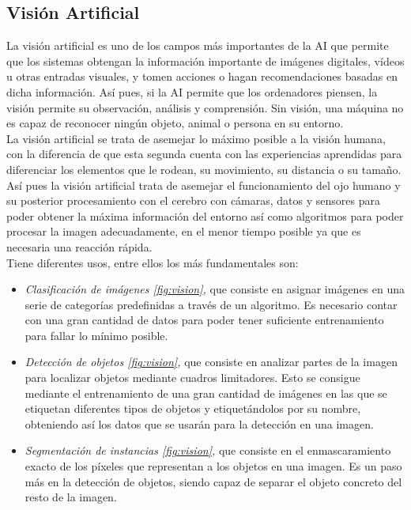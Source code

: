 \subsection{Visión Artificial}
\label{sec:subseccion}
La visión artificial es uno de los campos más importantes de la AI que permite que los sistemas obtengan la información importante de imágenes digitales, vídeos u otras entradas visuales, y tomen acciones o hagan recomendaciones basadas en dicha información. Así pues, si la AI permite que los ordenadores piensen, la visión permite su observación, análisis y comprensión. Sin visión, una máquina no es capaz de reconocer ningún objeto, animal o persona en su entorno. \\
La visión artificial se trata de asemejar lo máximo posible a la visión humana, con la diferencia de que esta segunda cuenta con las experiencias aprendidas para diferenciar los elementos que le rodean, su movimiento, su distancia o su tamaño. Así pues la visión artificial trata de asemejar el funcionamiento del ojo humano y su posterior procesamiento con el cerebro con cámaras, datos y sensores para poder obtener la máxima información del entorno así como algoritmos para poder procesar la imagen adecuadamente, en el menor tiempo posible ya que es necesaria una reacción rápida.\\
Tiene diferentes usos, entre ellos los más fundamentales son:
\begin{itemize}
 \item \textit{Clasificación de imágenes \ref{fig:vision},}  que consiste en asignar imágenes en una serie de categorías predefinidas a través de un algoritmo. Es necesario contar con una gran cantidad de datos para poder tener suficiente entrenamiento para fallar lo mínimo posible.
 \item \textit{Detección de objetos \ref{fig:vision},} que consiste en analizar partes de la imagen para localizar objetos mediante cuadros limitadores. Esto se consigue mediante el entrenamiento de una gran cantidad de imágenes en las que se etiquetan diferentes tipos de objetos y etiquetándolos por su nombre, obteniendo así los datos que se usarán para la detección en una imagen.
  \item \textit{Segmentación de instancias \ref{fig:vision},} que consiste en el enmascaramiento exacto de los píxeles que representan a los objetos en una imagen. Es un paso más en la detección de objetos, siendo capaz de separar el objeto concreto del resto de la imagen. 
\end{itemize}\
